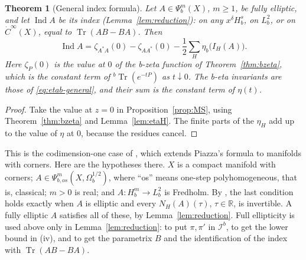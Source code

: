 \documentclass[11pt,oneside,reqno]{article}
\DeclareMathOperator{\Tr}{Tr}
\newcommand{\Ib}{\mathcal I^b}
\theoremstyle{plain}
\newtheorem{theorem}{Theorem}[section]
\theoremstyle{definition}
\theoremstyle{remark}
\begin{document}
\begin{theorem}[General index formula]\label{thm:indexgeneral}
Let \(A\in\Psi_b^m(X)\), \(m\geq1\), be fully elliptic, and let
\(\operatorname{Ind}A\) be its index (Lemma~\ref{lem:reduction}): on any
\(x^\delta H^s_b\), on \(L^2_b\), or on \(\dot C^\infty(X)\), equal to
\(\Tr(AB-BA)\). Then
\[
 \operatorname{Ind}A=\zeta_{A^*A}(0)-\zeta_{AA^*}(0)
 -\frac12\sum_H\eta_b\bigl(I_H(A)\bigr).
\]
Here \(\zeta_P(0)\) is the value at \(0\) of the b-zeta function of
Theorem~\ref{thm:bzeta}, which is the constant term of \({}^b\Tr(e^{-tP})\)
as \(t\downarrow0\). The b-eta invariants are those of
\eqref{eq:etab-general}, and their sum is the constant term of \(\eta(t)\).
\end{theorem}

\begin{proof}
Take the value at \(z=0\) in Proposition~\ref{prop:MS}, using
Theorem~\ref{thm:bzeta} and Lemma~\ref{lem:etaH}. The finite parts of the
\(\eta_H\) add up to the value of \(\eta\) at \(0\), because the residues
cancel.
\end{proof}

This is the codimension-one case of \cite[Thm.~8.6]{LoyaThesis}, which
extends Piazza's formula \cite{Piazza} to manifolds with corners. Here are
the hypotheses there. \(X\) is a compact manifold with corners;
\(A\in\Psi^m_{b,os}(X,\Omega_b^{1/2})\), where ``os'' means one-step
polyhomogeneous, that is, classical; \(m>0\) is real; and
\(A:H^m_b\to L^2_b\) is Fredholm. By \cite[Cor.~2.6]{LoyaThesis}, the last
condition holds exactly when \(A\) is elliptic and every \(N_H(A)(\tau)\),
\(\tau\in\mathbb R\), is invertible. A fully elliptic \(A\) satisfies all of
these, by Lemma~\ref{lem:reduction}. Full ellipticity is used above only in
Lemma~\ref{lem:reduction}: to put \(\pi,\pi'\) in \(\Ib\), to get the lower
bound in (iv), and to get the parametrix \(B\) and the identification of
the index with \(\Tr(AB-BA)\).
\end{document}
